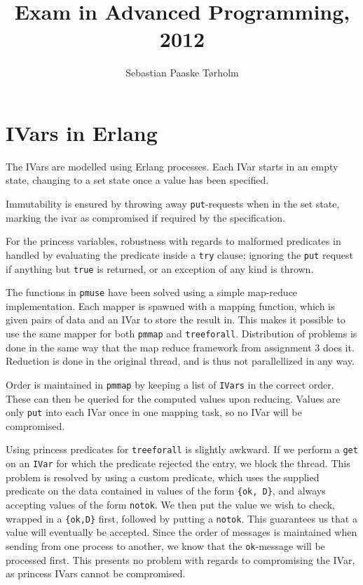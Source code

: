 \documentclass[11pt,a4paper]{article}
\title{Exam in Advanced Programming, 2012}
\author{Sebastian Paaske Tørholm}
\begin{document}
\maketitle

\section{IVars in Erlang}
The IVars are modelled using Erlang processes. Each IVar starts in an empty
state, changing to a set state once a value has been specified.

Immutability is ensured by throwing away \texttt{put}-requests when in the set
state, marking the ivar as compromised if required by the specification.

For the princess variables, robustness with regards to malformed predicates in
handled by evaluating the predicate inside a \texttt{try} clause; ignoring the
\texttt{put} request if anything but \texttt{true} is returned, or an exception
of any kind is thrown.

The functions in \texttt{pmuse} have been solved using a simple map-reduce
implementation. Each mapper is spawned with a mapping function, which is given
pairs of data and an IVar to store the result in. This makes it possible
to use the same mapper for both \texttt{pmmap} and \texttt{treeforall}.
Distribution of problems is done in the same way that the map reduce framework
from assignment 3 does it. Reduction is done in the original thread, and is
thus not parallellized in any way.

Order is maintained in \texttt{pmmap} by keeping a list of \texttt{IVars} in
the correct order. These can then be queried for the computed values upon
reducing. Values are only \texttt{put} into each IVar once in one mapping
task, so no IVar will be compromised.

Using princess predicates for \texttt{treeforall} is slightly awkward.
If we perform a \texttt{get} on an \texttt{IVar} for which the predicate
rejected the entry, we block the thread. This problem is resolved by using
a custom predicate, which uses the supplied predicate on the data contained
in values of the form \texttt{\{ok, D\}}, and always accepting values of the
form \texttt{notok}. We then put the value we wish to check, wrapped in a
\texttt{\{ok,D\}} first, followed by putting a \texttt{notok}. This guarantees
us that a value will eventually be accepted. Since the order of messages
is maintained when sending from one process to another, we know that the
\texttt{ok}-message will be processed first. This presents no problem with
regards to compromising the IVar, as princess IVars cannot be compromised.
\end{document}
